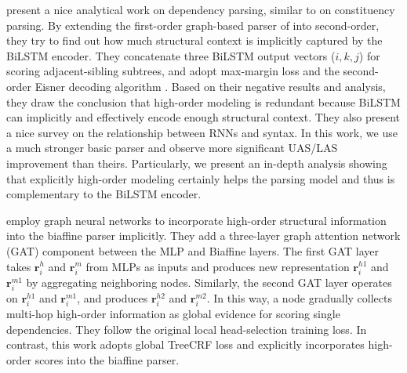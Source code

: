 \documentclass[11pt,a4paper]{article}
\begin{document}
\citet{falenska-kuhn-2019-non} present a nice analytical work on  dependency parsing, similar to \citet{gaddy-etal-2018-whats} on constituency parsing.
By extending the first-order graph-based parser of \citet{kiperwasser-goldberg-2016-simple}
into second-order, they try to find out
how much structural context is implicitly captured by the BiLSTM encoder.
They concatenate three BiLSTM output vectors ($i,k,j$) for scoring adjacent-sibling subtrees,
and adopt max-margin loss and the second-order Eisner decoding algorithm \cite{mcdonald-pereira-2006-online}.
Based on their negative results and analysis, they draw the conclusion that high-order modeling is redundant
because BiLSTM can implicitly and effectively encode enough structural context.
They also present a nice survey on the relationship between RNNs and syntax.
In this work, we use a much stronger basic parser and observe more significant UAS/LAS improvement than theirs.
Particularly, we present an in-depth analysis showing that explicitly high-order modeling
certainly helps the parsing model and thus is complementary to the BiLSTM encoder.



\citet{ji-etal-2019-graph} employ graph neural networks to incorporate high-order structural information into the biaffine parser implicitly.
They add a three-layer graph attention network (GAT) component \cite{velickovic2018graph} between the MLP and Biaffine layers.
The first GAT layer takes $\mathbf{r}_i^{h}$ and $\mathbf{r}_i^{m}$ from MLPs as inputs and produces new representation $\mathbf{r}_i^{h1}$ and $\mathbf{r}_i^{m1}$ by aggregating neighboring nodes. Similarly, the second GAT layer operates on $\mathbf{r}_i^{h1}$ and $\mathbf{r}_i^{m1}$, and produces $\mathbf{r}_i^{h2}$ and $\mathbf{r}_i^{m2}$.
In this way, a node gradually collects multi-hop  high-order information as global evidence for scoring single dependencies.
They follow the original local head-selection training loss.
In contrast, this work adopts global TreeCRF loss and explicitly incorporates high-order scores into the biaffine parser.
\end{document}
